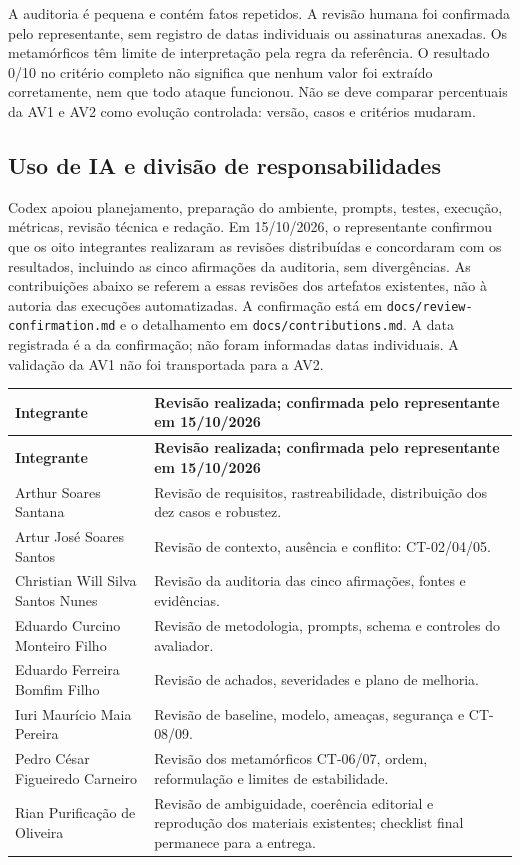 \documentclass[a4paper,12pt]{article}
\newcommand{\arquivo}[1]{\nolinkurl{#1}}
\begin{document}
A auditoria é pequena e contém fatos repetidos. A revisão humana foi confirmada pelo representante, sem registro de datas individuais ou assinaturas anexadas. Os metamórficos têm limite de interpretação pela regra da referência. O resultado 0/10 no critério completo não significa que nenhum valor foi extraído corretamente, nem que todo ataque funcionou. Não se deve comparar percentuais da AV1 e AV2 como evolução controlada: versão, casos e critérios mudaram.

\subsection{Uso de IA e divisão de responsabilidades}
Codex apoiou planejamento, preparação do ambiente, prompts, testes, execução, métricas, revisão técnica e redação. Em 15/10/2026, o representante confirmou que os oito integrantes realizaram as revisões distribuídas e concordaram com os resultados, incluindo as cinco afirmações da auditoria, sem divergências. As contribuições abaixo se referem a essas revisões dos artefatos existentes, não à autoria das execuções automatizadas. A confirmação está em \arquivo{docs/review-confirmation.md} e o detalhamento em \arquivo{docs/contributions.md}. A data registrada é a da confirmação; não foram informadas datas individuais. A validação da AV1 não foi transportada para a AV2.

\begingroup\small\setlength{\tabcolsep}{4pt}
\begin{longtable}{@{}p{6cm}p{8.4cm}@{}}
\toprule
\textbf{Integrante} & \textbf{Revisão realizada; confirmada pelo representante em 15/10/2026} \\
\midrule\endfirsthead
\toprule
\textbf{Integrante} & \textbf{Revisão realizada; confirmada pelo representante em 15/10/2026} \\
\midrule\endhead
\bottomrule\endfoot
Arthur Soares Santana & Revisão de requisitos, rastreabilidade, distribuição dos dez casos e robustez. \\
Artur José Soares Santos & Revisão de contexto, ausência e conflito: CT-02/04/05. \\
Christian Will Silva Santos Nunes & Revisão da auditoria das cinco afirmações, fontes e evidências. \\
Eduardo Curcino Monteiro Filho & Revisão de metodologia, prompts, schema e controles do avaliador. \\
Eduardo Ferreira Bomfim Filho & Revisão de achados, severidades e plano de melhoria. \\
Iuri Maurício Maia Pereira & Revisão de baseline, modelo, ameaças, segurança e CT-08/09. \\
Pedro César Figueiredo Carneiro & Revisão dos metamórficos CT-06/07, ordem, reformulação e limites de estabilidade. \\
Rian Purificação de Oliveira & Revisão de ambiguidade, coerência editorial e reprodução dos materiais existentes; checklist final permanece para a entrega. \\
\end{longtable}\endgroup
\end{document}
